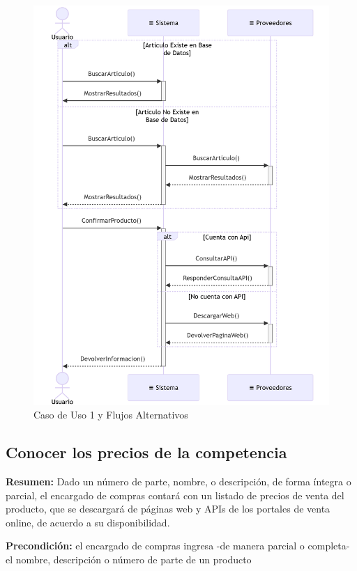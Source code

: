 \begin{figure}[H]
	\centering
	\vspace{15pt}
	\caption{Caso de Uso 1 y Flujos Alternativos}
	\vspace{15pt}
	\includegraphics[width=.9\textwidth]{img/04-diagrama-caso-1.png}
	\vspace{15pt}
\end{figure}

\pagebreak

\subsection{Conocer los precios de la competencia}

\textbf{Resumen:}
Dado un número de parte, nombre, o descripción,
de forma íntegra o parcial,
el encargado de compras contará con un listado de precios de venta del producto,
que se descargará de páginas web y APIs de los portales de venta online,
de acuerdo a su disponibilidad.

\textbf{Precondición:} 
el encargado de compras ingresa -de manera parcial o completa- el nombre, descripción o número de parte de un producto

